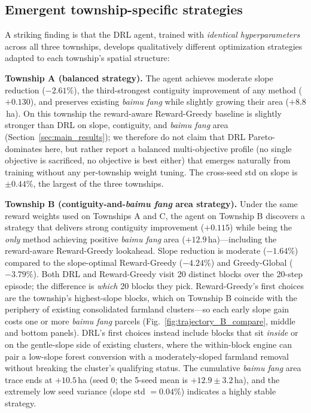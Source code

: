 \documentclass[preprint,12pt]{elsarticle}
\begin{document}
\subsection{Emergent township-specific strategies}
\label{sec:strategies}

A striking finding is that the DRL agent, trained with \textit{identical hyperparameters} across all three townships, develops qualitatively different optimization strategies adapted to each township's spatial structure:

\textbf{Township A (balanced strategy).} The agent achieves moderate slope reduction ($-2.61\%$), the third-strongest contiguity improvement of any method ($+0.130$), and preserves existing \textit{baimu fang} while slightly growing their area ($+8.8$\,ha). On this township the reward-aware Reward-Greedy baseline is slightly stronger than DRL on slope, contiguity, and \textit{baimu fang} area (Section~\ref{sec:main_results}); we therefore do not claim that DRL Pareto-dominates here, but rather report a balanced multi-objective profile (no single objective is sacrificed, no objective is best either) that emerges naturally from training without any per-township weight tuning. The cross-seed std on slope is $\pm0.44\%$, the largest of the three townships.

\textbf{Township B (contiguity-and-\textit{baimu fang} area strategy).} Under the same reward weights used on Townships A and C, the agent on Township B discovers a strategy that delivers strong contiguity improvement ($+0.115$) while being the \textit{only} method achieving positive \textit{baimu fang} area ($+12.9$\,ha)---including the reward-aware Reward-Greedy lookahead. Slope reduction is moderate ($-1.64\%$) compared to the slope-optimal Reward-Greedy ($-4.24\%$) and Greedy-Global ($-3.79\%$). Both DRL and Reward-Greedy visit 20 distinct blocks over the 20-step episode; the difference is \emph{which} 20 blocks they pick. Reward-Greedy's first choices are the township's highest-slope blocks, which on Township B coincide with the periphery of existing consolidated farmland clusters---so each early slope gain costs one or more \textit{baimu fang} parcels (Fig.~\ref{fig:trajectory_B_compare}, middle and bottom panels). DRL's first choices instead include blocks that sit \emph{inside} or on the gentle-slope side of existing clusters, where the within-block engine can pair a low-slope forest conversion with a moderately-sloped farmland removal without breaking the cluster's qualifying status. The cumulative \textit{baimu fang} area trace ends at $+10.5$\,ha (seed 0; the 5-seed mean is $+12.9 \pm 3.2$\,ha), and the extremely low seed variance (slope std $= 0.04\%$) indicates a highly stable strategy.
\end{document}
